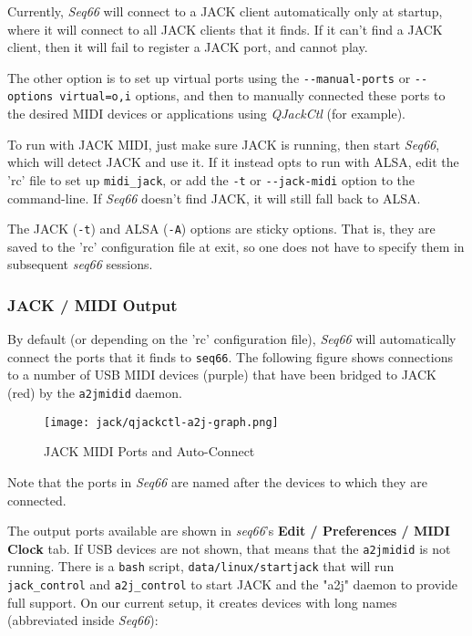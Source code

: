    Currently, \textsl{Seq66} will connect to a JACK
   client automatically only at startup, where it will connect to all JACK
   clients that it finds.  If it can't find a JACK client, then it will
   fail to register a JACK port, and cannot play.

   The other option is to set up virtual ports using the
   \texttt{-{}-manual-ports} or \texttt{-{}-options virtual=o,i} options, and then
   to manually connected these ports to the desired MIDI devices or
   applications using \textsl{QJackCtl} (for example).

   To run with JACK MIDI, just make sure JACK is running, then start
   \textsl{Seq66}, which will detect JACK and use it.
   If it instead opts to run with ALSA, edit the 'rc' file to set up
   \texttt{midi\_jack}, or add the
   \texttt{-t} or \texttt{-{}-jack-midi}
   option to the command-line.
   If \textsl{Seq66} doesn't find JACK, it will still fall back to ALSA.

   The JACK (\texttt{-t}) and ALSA (\texttt{-A}) options are sticky options.
   That is, they are saved to the 'rc' configuration file at exit,
   so one does not have to specify them in subsequent \textsl{seq66} sessions.

\subsubsection{JACK / MIDI Output}
\label{subsubsec:jack_midi_output}

   By default (or depending on the 'rc' configuration file),
   \textsl{Seq66} will
   automatically connect the ports that it finds to \texttt{seq66}.
   The following figure shows connections to a number of USB MIDI devices
   (purple) that have been bridged to JACK (red) by the \texttt{a2jmidid}
   daemon.

\begin{figure}[H]
   \centering 
   \texttt{[image: jack/qjackctl-a2j-graph.png]}
   \caption{JACK MIDI Ports and Auto-Connect}
   \label{fig:jack_midi_ports_auto_connect}
\end{figure}

   Note that the ports in \textsl{Seq66} are named after the devices to which
   they are connected.

	The output ports available are shown in \textsl{seq66}'s
	\textbf{Edit / Preferences / MIDI Clock} tab.
   If USB devices are not shown, that means
   that the \texttt{a2jmidid} is not running.
   There is a \texttt{bash} script, \texttt{data/linux/startjack}
   that will run \texttt{jack\_control} and \texttt{a2j\_control} to start JACK
   and the "a2j" daemon to provide full support.
   On our current setup, it creates devices with long names (abbreviated inside
   \textsl{Seq66}):

